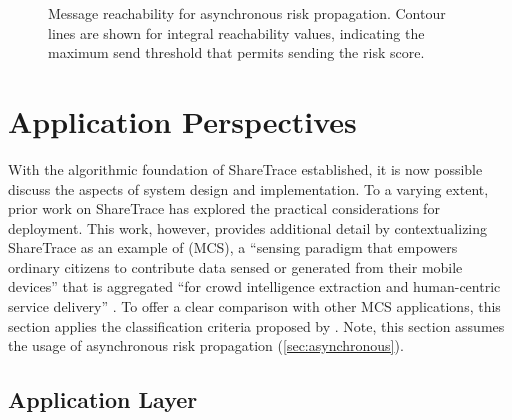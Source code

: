 \begin{figure}[htbp]
\centering
{}
\caption[Message reachability for asynchronous risk propagation]{Message reachability for asynchronous risk propagation. Contour lines are shown for integral reachability values, indicating the maximum send threshold that permits sending the risk score.}
\label{fig:reach}
\end{figure}

\section{Application Perspectives}

With the algorithmic foundation of ShareTrace established, it is now possible discuss the aspects of system design and implementation. To a varying extent, prior work on ShareTrace \citep[\cref{ch:previous-designs}]{Ayday2020, Ayday2021} has explored the practical considerations for deployment. This work, however, provides additional detail by contextualizing ShareTrace as an example of  (MCS), a ``sensing paradigm that empowers ordinary citizens to contribute data sensed or generated from their mobile devices'' that is aggregated ``for crowd intelligence extraction and human-centric service delivery'' \citep{Guo2015}. To offer a clear comparison with other MCS applications, this section applies the classification criteria proposed by \citet{Capponi2019}. Note, this section assumes the usage of asynchronous risk propagation (\cref{sec:asynchronous}).

\subsection{Application Layer}

